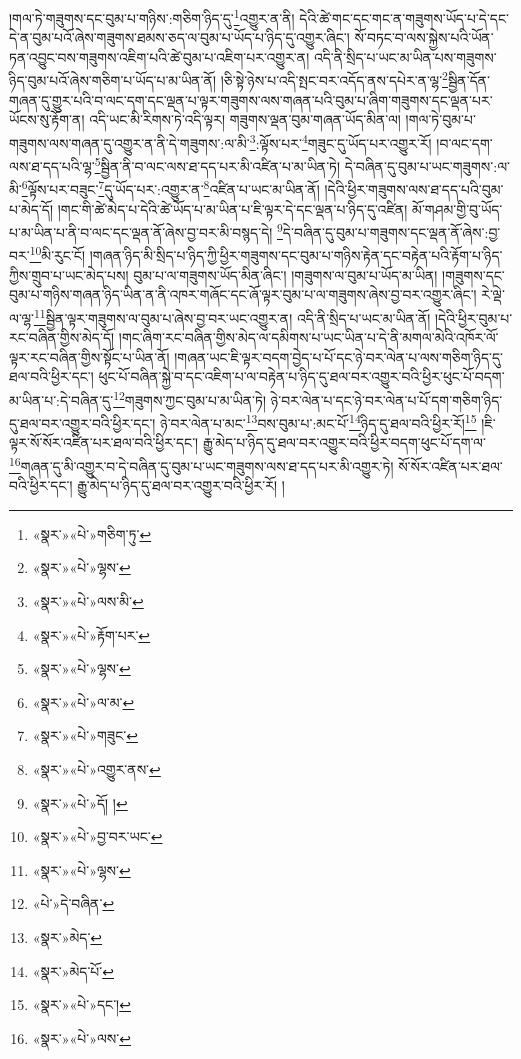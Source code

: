 །གལ་ཏེ་གཟུགས་དང་བུམ་པ་གཉིས་:གཅིག་ཉིད་དུ་\footnote{«སྣར་»«པེ་»གཅིག་ཏུ་}འགྱུར་ན་ནི། དེའི་ཚེ་གང་དང་གང་ན་གཟུགས་ཡོད་པ་དེ་དང་དེ་ན་བུམ་པའོ་ཞེས་གཟུགས་ཐམས་ཅད་ལ་བུམ་པ་ཡོད་པ་ཉིད་དུ་འགྱུར་ཞིང་། སོ་བཏང་བ་ལས་སྐྱེས་པའི་ཡོན་ཏན་འབྱུང་བས་གཟུགས་འཇིག་པའི་ཚེ་བུམ་པ་འཇིག་པར་འགྱུར་ན། འདི་ནི་སྲིད་པ་ཡང་མ་ཡིན་པས་གཟུགས་ཉིད་བུམ་པའོ་ཞེས་གཅིག་པ་ཡོད་པ་མ་ཡིན་ནོ། །ཅི་སྟེ་ཉེས་པ་འདི་སྤང་བར་འདོད་ནས་དཔེར་ན་ལྷ་\footnote{«སྣར་»«པེ་»ལྷས་}སྦྱིན་དོན་གཞན་དུ་གྱུར་པའི་བ་ལང་དག་དང་ལྡན་པ་ལྟར་གཟུགས་ལས་གཞན་པའི་བུམ་པ་ཞིག་གཟུགས་དང་ལྡན་པར་ཡོངས་སུ་རྟོག་ན། འདི་ཡང་མི་རིགས་ཏེ་འདི་ལྟར། གཟུགས་ལྡན་བུམ་གཞན་ཡོད་མིན་ལ། །གལ་ཏེ་བུམ་པ་གཟུགས་ལས་གཞན་དུ་འགྱུར་ན་ནི་དེ་གཟུགས་:ལ་མི་\footnote{«སྣར་»«པེ་»ལས་མི་}:ལྟོས་པར་\footnote{«སྣར་»«པེ་»རྟོག་པར་}གཟུང་དུ་ཡོད་པར་འགྱུར་རོ། །བ་ལང་དག་ལས་ཐ་དད་པའི་ལྷ་\footnote{«སྣར་»«པེ་»ལྷས་}སྦྱིན་ནི་བ་ལང་ལས་ཐ་དད་པར་མི་འཛིན་པ་མ་ཡིན་ཏེ། དེ་བཞིན་དུ་བུམ་པ་ཡང་གཟུགས་:ལ་མི་\footnote{«སྣར་»«པེ་»ལ་མ་}ལྟོས་པར་བཟུང་\footnote{«སྣར་»«པེ་»གཟུང་}དུ་ཡོད་པར་:འགྱུར་ན་\footnote{«སྣར་»«པེ་»འགྱུར་ནས་}འཛིན་པ་ཡང་མ་ཡིན་ནོ། །དེའི་ཕྱིར་གཟུགས་ལས་ཐ་དད་པའི་བུམ་པ་མེད་དོ། །གང་གི་ཚེ་མེད་པ་དེའི་ཚེ་ཡོད་པ་མ་ཡིན་པ་ཇི་ལྟར་དེ་དང་ལྡན་པ་ཉིད་དུ་འཛིན། མོ་གཤམ་གྱི་བུ་ཡོད་པ་མ་ཡིན་པ་ནི་བ་ལང་དང་ལྡན་ནོ་ཞེས་བྱ་བར་མི་བསྙད་དེ། \footnote{«སྣར་»«པེ་»དོ། ། }དེ་བཞིན་དུ་བུམ་པ་གཟུགས་དང་ལྡན་ནོ་ཞེས་:བྱ་བར་\footnote{«སྣར་»«པེ་»བྱ་བར་ཡང་}མི་རུང་ངོ། །གཞན་ཉིད་མི་སྲིད་པ་ཉིད་ཀྱི་ཕྱིར་གཟུགས་དང་བུམ་པ་གཉིས་རྟེན་དང་བརྟེན་པའི་རྟོག་པ་ཉིད་ཀྱིས་གྲུབ་པ་ཡང་མེད་པས། བུམ་པ་ལ་གཟུགས་ཡོད་མིན་ཞིང་། །གཟུགས་ལ་བུམ་པ་ཡོད་མ་ཡིན། །གཟུགས་དང་བུམ་པ་གཉིས་གཞན་ཉིད་ཡིན་ན་ནི་འཁར་གཞོང་དང་ཞོ་ལྟར་བུམ་པ་ལ་གཟུགས་ཞེས་བྱ་བར་འགྱུར་ཞིང་། རེ་ལྡེ་ལ་ལྷ་\footnote{«སྣར་»«པེ་»ལྷས་}སྦྱིན་ལྟར་གཟུགས་ལ་བུམ་པ་ཞེས་བྱ་བར་ཡང་འགྱུར་ན། འདི་ནི་སྲིད་པ་ཡང་མ་ཡིན་ནོ། །དེའི་ཕྱིར་བུམ་པ་རང་བཞིན་གྱིས་མེད་དོ། །གང་ཞིག་རང་བཞིན་གྱིས་མེད་ལ་དམིགས་པ་ཡང་ཡིན་པ་དེ་ནི་མགལ་མེའི་འཁོར་ལོ་ལྟར་རང་བཞིན་གྱིས་སྟོང་པ་ཡིན་ནོ། །གཞན་ཡང་ཇི་ལྟར་བདག་བྱེད་པ་པོ་དང་ཉེ་བར་ལེན་པ་ལས་གཅིག་ཉིད་དུ་ཐལ་བའི་ཕྱིར་དང་། ཕུང་པོ་བཞིན་སྐྱེ་བ་དང་འཇིག་པ་ལ་བརྟེན་པ་ཉིད་དུ་ཐལ་བར་འགྱུར་བའི་ཕྱིར་ཕུང་པོ་བདག་མ་ཡིན་པ་:དེ་བཞིན་དུ་\footnote{«པེ་»དེ་བཞིན་}གཟུགས་ཀྱང་བུམ་པ་མ་ཡིན་ཏེ། ཉེ་བར་ལེན་པ་དང་ཉེ་བར་ལེན་པ་པོ་དག་གཅིག་ཉིད་དུ་ཐལ་བར་འགྱུར་བའི་ཕྱིར་དང་། ཉེ་བར་ལེན་པ་མང་\footnote{«སྣར་»མེད་}བས་བུམ་པ་:མང་པོ་\footnote{«སྣར་»མེད་པོ་}ཉིད་དུ་ཐལ་བའི་ཕྱིར་རོ།\footnote{«སྣར་»«པེ་»དང་།} །ཇི་ལྟར་སོ་སོར་འཛིན་པར་ཐལ་བའི་ཕྱིར་དང་། རྒྱུ་མེད་པ་ཉིད་དུ་ཐལ་བར་འགྱུར་བའི་ཕྱིར་བདག་ཕུང་པོ་དག་ལ་\footnote{«སྣར་»«པེ་»ལས་}གཞན་དུ་མི་འགྱུར་བ་དེ་བཞིན་དུ་བུམ་པ་ཡང་གཟུགས་ལས་ཐ་དད་པར་མི་འགྱུར་ཏེ། སོ་སོར་འཛིན་པར་ཐལ་བའི་ཕྱིར་དང་། རྒྱུ་མེད་པ་ཉིད་དུ་ཐལ་བར་འགྱུར་བའི་ཕྱིར་རོ། །
